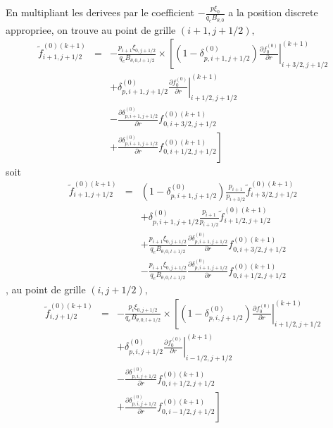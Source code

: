 En multipliant les derivees par le coefficient $-\frac{p\xi_{0}}{q_{e}B_{\theta,0}}$
a la position discrete appropriee, on trouve au point de grille $\left(i+1,j+1/2\right),$\begin{eqnarray*}
\widetilde{f}_{i+1,j+1/2}^{\left(0\right)(k+1)} & = & -\frac{p_{i+1}\xi_{0,j+1/2}}{q_{e}B_{\theta,0,l+1/2}}\times\left[\left(1-\delta_{p,i+1,j+1/2}^{(0)}\right)\left.\frac{\partial f_{0}^{(0)}}{\partial r}\right|_{i+3/2,j+1/2}^{(k+1)}\right.\\
 &  & +\delta_{p,i+1,j+1/2}^{(0)}\left.\frac{\partial f_{0}^{(0)}}{\partial r}\right|_{i+1/2,j+1/2}^{(k+1)}\\
 &  & -\frac{\partial\delta_{p,i+1,j+1/2}^{(0)}}{\partial r}f_{0,i+3/2,j+1/2}^{\left(0\right)(k+1)}\\
 &  & \left.+\frac{\partial\delta_{p,i+1,j+1/2}^{(0)}}{\partial r}f_{0,i+1/2,j+1/2}^{\left(0\right)(k+1)}\right]\end{eqnarray*}
 soit \begin{eqnarray*}
\widetilde{f}_{i+1,j+1/2}^{\left(0\right)(k+1)} & = & \left(1-\delta_{p,i+1,j+1/2}^{(0)}\right)\frac{p_{i+1}}{p_{i+3/2}}\widetilde{f}_{i+3/2,j+1/2}^{\left(0\right)(k+1)}\\
 &  & +\delta_{p,i+1,j+1/2}^{(0)}\frac{p_{i+1}}{p_{i+1/2}}\widetilde{f}_{i+1/2,j+1/2}^{\left(0\right)(k+1)}\\
 &  & +\frac{p_{i+1}\xi_{0,j+1/2}}{q_{e}B_{\theta,0,l+1/2}}\frac{\partial\delta_{p,i+1,j+1/2}^{(0)}}{\partial r}f_{0,i+3/2,j+1/2}^{\left(0\right)(k+1)}\\
 &  & -\frac{p_{i+1}\xi_{0,j+1/2}}{q_{e}B_{\theta,0,l+1/2}}\frac{\partial\delta_{p,i+1,j+1/2}^{(0)}}{\partial r}f_{0,i+1/2,j+1/2}^{\left(0\right)(k+1)}\end{eqnarray*}
 , au point de grille $\left(i,j+1/2\right),$\begin{eqnarray*}
\widetilde{f}_{i,j+1/2}^{\left(0\right)(k+1)} & = & -\frac{p_{i}\xi_{0,j+1/2}}{q_{e}B_{\theta,0,l+1/2}}\times\left[\left(1-\delta_{p,i,j+1/2}^{(0)}\right)\left.\frac{\partial f_{0}^{(0)}}{\partial r}\right|_{i+1/2,j+1/2}^{(k+1)}\right.\\
 &  & +\delta_{p,i,j+1/2}^{(0)}\left.\frac{\partial f_{0}^{(0)}}{\partial r}\right|_{i-1/2,j+1/2}^{(k+1)}\\
 &  & -\frac{\partial\delta_{p,i,j+1/2}^{(0)}}{\partial r}f_{0,i+1/2,j+1/2}^{\left(0\right)(k+1)}\\
 &  & \left.+\frac{\partial\delta_{p,i,j+1/2}^{(0)}}{\partial r}f_{0,i-1/2,j+1/2}^{\left(0\right)(k+1)}\right]\end{eqnarray*}
